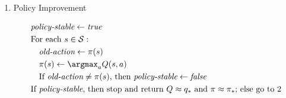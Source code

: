 \begin{solution}
\begin{tcolorbox}[title = Policy Iteration (using iterative policy evaluation) for estimating $\pi \approx \pi_\ast$]
\begin{enumerate}[label = \arabic*.]
        \item Policy Improvement

        \begin{align*}
            & \textit{policy-stable} \leftarrow \textit{true} \\
            & \text{For each $s \in \mathcal S$}: \\
            & \quad \textit{old-action} \leftarrow \pi(s) \\
            & \quad \pi(s) \leftarrow \argmax_a Q(s, a) \\
            & \quad \text{If $\textit{old-action} \neq \pi(s)$, then $\textit{policy-stable} \leftarrow \textit{false}$} \\
            & \text{If $\textit{policy-stable}$, then stop and return $Q \approx q_\ast$ and $\pi \approx \pi_\ast$; else go to $2$}
        \end{align*}

    \end{enumerate}

\end{tcolorbox}

\end{solution}

